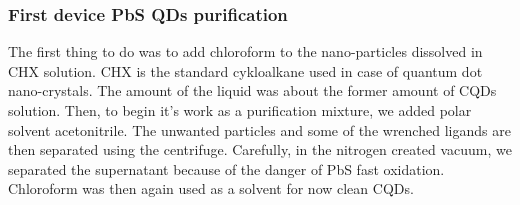 \subsubsection{First device PbS QDs purification}
The first thing to do was to add chloroform to the nano-particles dissolved in CHX solution. CHX is the standard cykloalkane used in case of quantum dot nano-crystals. The amount of the liquid was about the former amount of CQDs solution. Then, to begin it's work as a purification mixture, we added polar solvent acetonitrile. The unwanted particles and some of the wrenched ligands are then separated using the centrifuge. Carefully, in the nitrogen created vacuum, we separated the supernatant because of the danger of PbS fast oxidation. Chloroform was then again used as a solvent for now clean CQDs.

